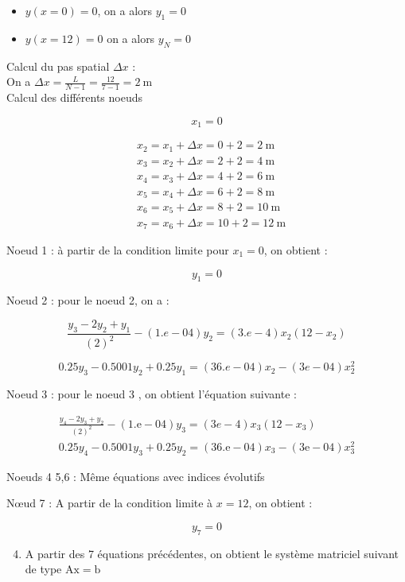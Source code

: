 \documentclass[10pt]{article}
\begin{document}
\begin{itemize}
  \item \(y(x=0)=0\), on a alors \(y_{1}=0\)
  \item \(y(x=12)=0\) on a alors \(y_{N}=0\)
\end{itemize}

Calcul du pas spatial \(\Delta x\) :\\
On a \(\Delta x=\frac{L}{N-1}=\frac{12}{7-1}=2 \mathrm{~m}\)\\
Calcul des différents noeuds

\[
x_{1}=0
\]

\[
\begin{aligned}
& x_{2}=x_{1}+\Delta x=0+2=2 \mathrm{~m} \\
& x_{3}=x_{2}+\Delta x=2+2=4 \mathrm{~m} \\
& x_{4}=x_{3}+\Delta x=4+2=6 \mathrm{~m} \\
& x_{5}=x_{4}+\Delta x=6+2=8 \mathrm{~m} \\
& x_{6}=x_{5}+\Delta x=8+2=10 \mathrm{~m} \\
& x_{7}=x_{6}+\Delta x=10+2=12 \mathrm{~m}
\end{aligned}
\]

Noeud 1 : à partir de la condition limite pour \(x_{1}=0\), on obtient :

\[
y_{1}=0
\]

Noeud 2 : pour le noeud 2, on a :

\[
\frac{y_{3}-2 y_{2}+y_{1}}{(2)^{2}}-(1 . e-04) y_{2}=(3 . e-4) x_{2}\left(12-x_{2}\right)
\]

\[
0.25 y_{3}-0.5001 y_{2}+0.25 y_{1}=(36 . e-04) x_{2}-(3 e-04) x_{2}^{2}
\]

Noeud 3 : pour le noeud 3 , on obtient l'équation suivante :

\[
\begin{array}{r}
\frac{y_{4}-2 y_{3}+y_{2}}{(2)^{2}}-(1 . \mathrm{e}-04) y_{3}=(3 e-4) x_{3}\left(12-x_{3}\right) \\
0.25 y_{4}-0.5001 y_{3}+0.25 y_{2}=(36 . \mathrm{e}-04) x_{3}-(3 \mathrm{e}-04) x_{3}^{2}
\end{array}
\]

Noeuds 4 5,6 : Même équations avec indices évolutifs

Nœud 7 : A partir de la condition limite à \(x=12\), on obtient :

\[
y_{7}=0
\]

\begin{enumerate}
  \setcounter{enumi}{3}
  \item A partir des 7 équations précédentes, on obtient le système matriciel suivant de type \(\mathrm{A} \mathrm{x}=\mathrm{b}\)
\end{enumerate}
\end{document}
